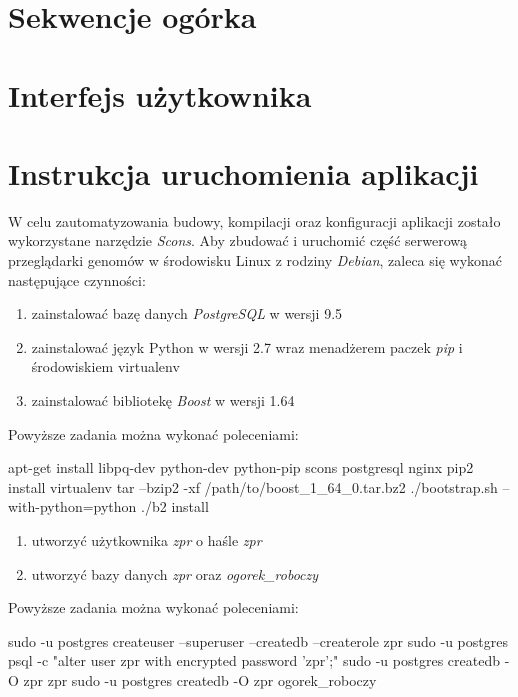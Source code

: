 \section{Sekwencje ogórka}

\section{Interfejs użytkownika}

\section{Instrukcja uruchomienia aplikacji}
W celu zautomatyzowania budowy, kompilacji oraz konfiguracji aplikacji zostało wykorzystane narzędzie \textit{Scons}.
Aby zbudować i uruchomić część serwerową przeglądarki genomów w środowisku Linux z rodziny \textit{Debian}, zaleca się wykonać następujące czynności:
\begin{enumerate}
	\item zainstalować bazę danych \textit{PostgreSQL} w wersji 9.5
	\item zainstalować język Python w wersji 2.7 wraz menadżerem paczek \textit{pip} i środowiskiem virtualenv
	\item zainstalować bibliotekę \textit{Boost} w wersji 1.64
\end{enumerate}
Powyższe zadania można wykonać poleceniami:

\begin{spverbatim}
	apt-get install libpq-dev python-dev python-pip scons postgresql nginx
	pip2 install virtualenv
	tar --bzip2 -xf /path/to/boost_1_64_0.tar.bz2 ./bootstrap.sh --with-python=python ./b2 install
\end{spverbatim}

\begin{enumerate}[resume]
	\item utworzyć użytkownika \textit{zpr} o haśle \textit{zpr}
	\item utworzyć bazy danych \textit{zpr} oraz \textit{ogorek\_roboczy}
\end{enumerate}
Powyższe zadania można wykonać poleceniami:

\begin{spverbatim}
	sudo -u postgres createuser --superuser --createdb --createrole zpr 
	sudo -u postgres psql -c "alter user zpr with encrypted password 'zpr';"
	sudo -u postgres createdb -O zpr zpr 
	sudo -u postgres createdb -O zpr ogorek_roboczy
\end{spverbatim}

